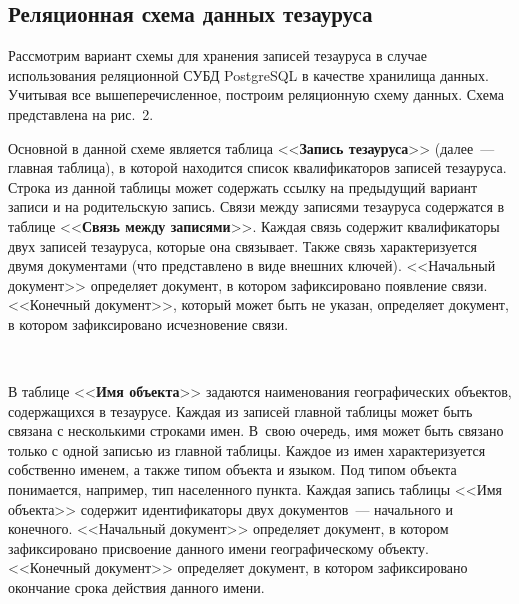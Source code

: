 \begin{multicols}{2}
  \section{Реляционная схема данных тезауруса}
  
  Рассмотрим вариант схемы для хранения записей тезауруса в случае использования 
реляционной СУБД {PostgreSQL} в качестве хранилища данных. Учитывая все 
вышеперечисленное, построим реляционную схему данных. Схема представлена на рис.~2.
  
  Основной в данной схеме является таблица <<\textbf{Запись тезауруса}>> (далее~--- 
главная таблица), в которой находится список квалификаторов записей тезауруса. Строка из 
данной таблицы может содержать ссылку на предыдущий вариант записи и на родительскую 
запись. Связи между записями тезауруса содержатся в таблице <<\textbf{Связь между 
записями}>>. Каждая связь содержит квалификаторы двух записей тезауруса, которые она 
связывает. Также связь характеризуется двумя документами (что представлено в виде 
внешних ключей). <<Начальный документ>> определяет документ, в котором 
зафиксировано появление связи. <<Конечный документ>>, который может быть не указан, 
определяет документ, в котором зафиксировано исчезновение связи.
  
  \begin{figure*} %
    \vspace*{1pt}
 \begin{center}
 \mbox{%
 \epsfxsize=164.503mm
 }
 \end{center}
 \vspace*{-9pt}
  \end{figure*}
  
  В таблице <<\textbf{Имя объекта}>> задаются наименования географических объектов, 
содержащихся в тезаурусе. Каждая из записей главной таблицы может быть связана с 
несколькими строками имен. В~свою очередь, имя может быть связано только с одной 
записью из главной таблицы. Каждое из имен характеризуется собственно именем, а также 
типом объекта и языком. Под типом объекта понимается, например, тип населенного пункта. 
Каждая запись таблицы <<Имя объекта>> содержит идентификаторы двух документов~--- 
начального и конечного. <<Начальный документ>> определяет документ, в котором 
зафиксировано присвоение данного имени географическому объекту. <<Конечный 
документ>> определяет документ, в котором зафиксировано окончание срока действия 
данного имени.
  

\end{multicols}
